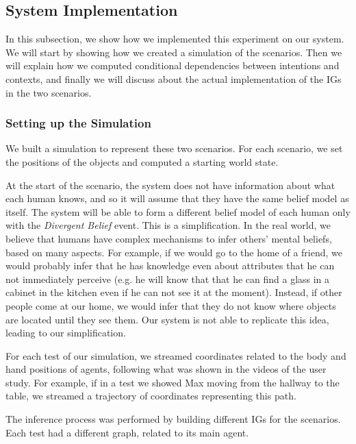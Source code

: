 \subsection{System Implementation}
\label{subsec:observer_results-system_implementation}
In this subsection, we show how we implemented this experiment on our system. We will start by showing how we created a simulation of the scenarios. Then we will explain how we computed conditional dependencies between intentions and contexts, and finally we will discuss about the actual implementation of the IGs in the two scenarios.

\subsubsection{Setting up the Simulation}
We built a simulation to represent these two scenarios. For each scenario, we set the positions of the objects and computed a starting world state.

 At the start of the scenario, the system does not have information about what each human knows, and so it will assume that they have the same belief model as itself. The system will be able to form a different belief model of each human only with the \textit{Divergent Belief} event. This is a simplification. In the real world, we believe that humans have complex mechanisms to infer others' mental beliefs, based on many aspects. For example, if we would go to the home of a friend, we would probably infer that he has knowledge even about attributes that he can not immediately perceive (e.g. he will know that that he can find a glass in a cabinet in the kitchen even if he can not see it at the moment). Instead, if other people come at our home, we would infer that they do not know where objects are located until they see them. Our system is not able to replicate this idea, leading to our simplification.

 For each test of our simulation, we streamed coordinates related to the body and hand positions of agents, following what was shown in the videos of the user study. For example, if in a test we showed Max moving from the hallway to the table, we streamed a trajectory of coordinates representing this path. 

The inference process was performed by building different IGs for the scenarios. Each test had a different graph, related to its main agent. 

